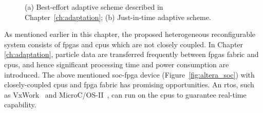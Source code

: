 \setcounter{subfigure}{0}
\begin{figure}[t!]
\centering
{}
\caption{(a) Best-effort adaptive scheme described in Chapter~\ref{ch:adaptation}; (b) Just-in-time adaptive scheme.}
\end{figure}

As mentioned earlier in this chapter, the proposed heterogeneous reconfigurable system consists of \glspl{fpga} and \glspl{cpu} which are not closely coupled.
In Chapter \ref{ch:adaptation}, particle data are transferred frequently between \glspl{fpga} fabric and \glspl{cpu}, and hence significant processing time and power consumption are introduced.
The above mentioned \gls{soc}-\gls{fpga} device (Figure~\ref{fig:altera_soc}) with closely-coupled \glspl{cpu} and \gls{fpga} fabric has promising opportunities.
An \gls{rtos}, such as VxWork~\cite{vxworks} and MicroC/OS-II~\cite{microcos}, can run on the \glspl{cpu} to guarantee real-time capability.



